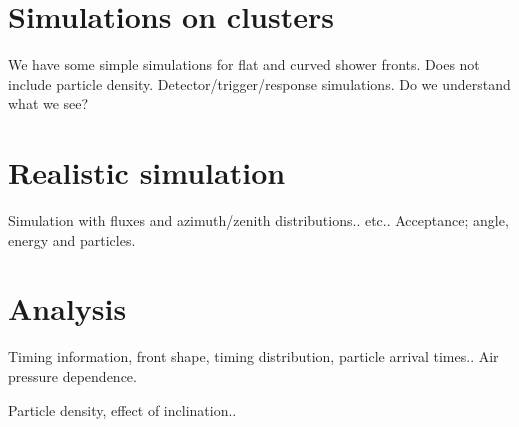 \section{Simulations on clusters}

We have some simple simulations for flat and curved shower fronts.
Does not include particle density.
Detector/trigger/response simulations. Do we understand what we see?


\section{Realistic simulation}

Simulation with fluxes and azimuth/zenith distributions..
etc..
Acceptance; angle, energy and particles.


\section{Analysis}

Timing information, front shape, timing distribution, particle arrival times..
Air pressure dependence.

Particle density, effect of inclination..
